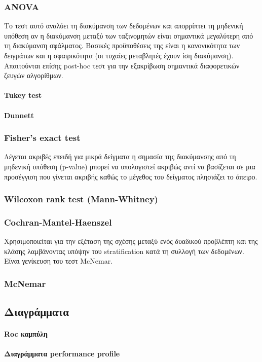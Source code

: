 \documentclass[]{article}
\numberwithin{equation}{section}		%
\numberwithin{figure}{section}			%
\numberwithin{table}{section}				%
\begin{document}
    \subsubsection{ANOVA} Το τεστ αυτό αναλύει τη διακύμανση των δεδομένων και απορρίπτει τη μηδενική υπόθεση αν η διακύμανση μεταξύ των ταξινομητών είναι σημαντικά μεγαλύτερη από τη διακύμανση σφάλματος. Βασικές προϋποθέσεις της είναι η κανονικότητα των δειγμάτων και η σφαιρικότητα (οι τυχαίες μεταβλητές έχουν ίση διακύμανση). Απαιτούνται επίσης post-hoc τεστ για την εξακρίβωση σημαντικά διαφορετικών ζευγών αλγορίθμων.   
    \paragraph{Tukey test}
    \paragraph{Dunnett}
    \subsubsection{Fisher's exact test}
    Λέγεται ακριβές επειδή για μικρά δείγματα η σημασία της διακύμανσης από τη μηδενική υπόθεση (p-value) μπορεί να υπολογιστεί ακριβώς αντί να βασίζεται σε μια προσέγγιση που γίνεται ακριβής καθώς το μέγεθος του δείγματος πλησιάζει το άπειρο.
    \subsubsection{Wilcoxon rank test (Mann-Whitney)}
    \subsubsection{Cochran-Mantel-Haenszel}
    Χρησιμοποιείται για την εξέταση της σχέσης μεταξύ ενός δυαδικού προβλέπτη και της κλάσης λαμβάνοντας υπόψην του stratification κατά τη συλλογή των δεδομένων. Είναι γενίκευση του τεστ McNemar.
    \subsubsection{McNemar}
    \subsection{Διαγράμματα}
    \paragraph{Roc καμπύλη}
    \paragraph{Διαγράμματα performance profile}
    \citep{Dolan2002}
\end{document}
